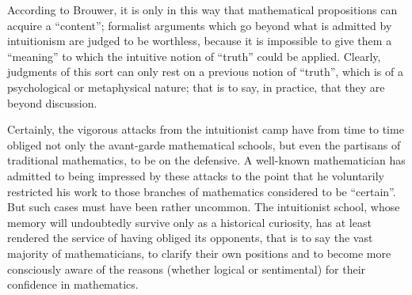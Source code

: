 According to Brouwer, it is only in this way that mathematical propositions can acquire a ``content''; formalist arguments which go beyond what is admitted by intuitionism are judged to be worthless, because it is impossible to give them a ``meaning'' to which the intuitive notion of ``truth'' could be applied. Clearly, judgments of this sort can only rest on a previous notion of ``truth'', which is of a psychological or metaphysical nature; that is to say, in practice, that they are beyond discussion.

Certainly, the vigorous attacks from the intuitionist camp have from time to time obliged not only the avant-garde mathematical schools, but even the partisans of traditional mathematics, to be on the defensive. A well-known mathematician has admitted to being impressed by these attacks to the point that he voluntarily restricted his work to those branches of mathematics considered to be ``certain''. But such cases must have been rather uncommon. The intuitionist school, whose memory will undoubtedly survive only as a historical curiosity, has at least rendered the service of having obliged its opponents, that is to say the vast majority of mathematicians, to clarify their own positions and to become more consciously aware of the reasons (whether logical or sentimental) for their confidence in mathematics.

